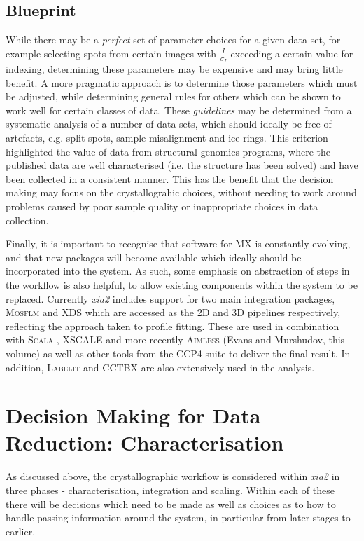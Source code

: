 \documentclass[preprint,pdf]{iucr}
\begin{document}
\subsection{Blueprint}

While there may be a \emph{perfect} set of parameter choices for a
given data set, for example selecting spots from certain images with
$\frac{I}{\sigma_I}$ exceeding a certain value for indexing,
determining these parameters may be expensive and may bring little
benefit. A more pragmatic approach is to determine those parameters
which must be adjusted, while determining general rules for others
which can be shown to work well for certain classes of data.
These \emph{guidelines} may be determined from a systematic
analysis of a number of data sets, which should ideally be free of
artefacts, e.g. split spots, sample misalignment and ice rings. 
This criterion highlighted the value of data from 
structural genomics programs, where the published data are well
characterised (i.e. the structure has been solved) and have been
collected in a consistent manner. This has the benefit that the
decision making may focus on the crystallograhic choices, without
needing to work around problems caused by poor sample quality or
inappropriate choices in data collection. 

Finally, it is important to recognise that software for MX is
constantly evolving, and that new packages will become available which
ideally should be incorporated into the system. As such, some emphasis
on abstraction of steps in the workflow is also helpful, to allow
existing components within the system to be replaced. Currently \emph{xia2} 
includes support for two main integration packages, \textsc{Mosflm}
\cite{leslie1992rcm} and XDS \cite{Kabsch:dz5179}
which are accessed as the 2D and 3D
pipelines respectively, reflecting the approach taken to profile
fitting. These are used in combination with \textsc{Scala} \cite{Evans:ba5084}, XSCALE
and more recently \textsc{Aimless} (Evans and Murshudov, this volume) as well
as other
tools from the CCP4 suite to deliver the final result. In
addition, \textsc{Labelit} \cite{Sauter:dd5008} and CCTBX
\cite{Grosse-Kunstleve:ks0118} are also 
extensively used in the analysis.

\section{Decision Making for Data Reduction: Characterisation}

As discussed above, the crystallographic workflow is considered within
\emph{xia2} in three phases - characterisation, integration and
scaling. Within each of these there will be decisions which need to be
made as well as choices as to how to handle passing information
around the system, in particular from later stages to earlier. 
\end{document}
